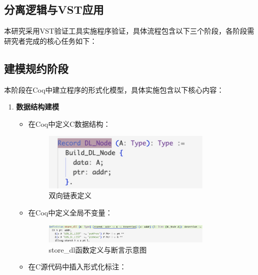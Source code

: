 \subsection{分离逻辑与VST应用}
\label{subsec:sep-vst}

本研究采用VST验证工具实施程序验证，具体流程包含以下三个阶段，各阶段需研究者完成的核心任务如下：

\subsection{建模规约阶段}
\label{subsec:preparation}
本阶段在Coq中建立程序的形式化模型，具体实施包含以下核心内容：
\begin{enumerate}
    \item \textbf{数据结构建模}
    \begin{itemize}
        \item 在Coq中定义C数据结构：
        \begin{figure}[h]  %
            \centering  %
            \includegraphics[width=0.8\textwidth]{./fig/Record_dll.png}  %
            \caption{双向链表定义}  %
            \label{fig:Record_dll}  %
        \end{figure}
        \item 在Coq中定义全局不变量：
        \begin{figure}[h]  %
            \centering  %
            \includegraphics[width=0.8\textwidth]{./fig/store_dll.png}  %
            \caption{store\_dl函数定义与断言示意图}  %
            \label{fig:store-dl}  %
        \end{figure}
        \item 在C源代码中插入形式化标注：
        \begin{figure}[h]  %

\end{figure}
\end{itemize}
\end{enumerate}
